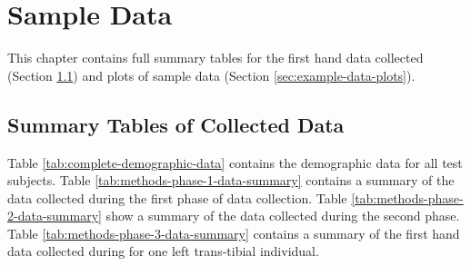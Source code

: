 \chapter{Sample Data}
\label{chp:data-summary-tables}
This chapter contains full summary tables for the first hand data collected (Section \ref{sec:summary-tables}) and plots of sample data (Section \ref{sec:example-data-plots}).

\clearpage
\section{Summary Tables of Collected Data}
\label{sec:summary-tables}
Table \ref{tab:complete-demographic-data} contains the demographic data for all test subjects. Table \ref{tab:methods-phase-1-data-summary} contains a summary of the data collected during the first phase of data collection. Table \ref{tab:methods-phase-2-data-summary} show a summary of the data collected during the second phase. Table \ref{tab:methods-phase-3-data-summary} contains a summary of the first hand data collected during for one left trans-tibial individual.

